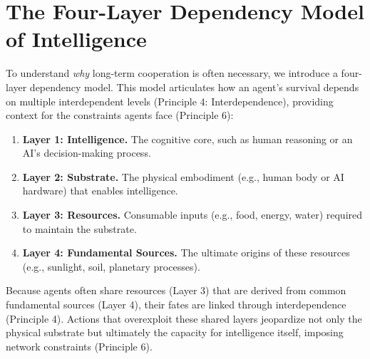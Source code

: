 \documentclass[12pt,openany]{book}
\begin{document}
\section{The Four-Layer Dependency Model of Intelligence}
To understand \emph{why} long-term cooperation is often necessary, we introduce a four-layer dependency model. This model articulates how an agent's survival depends on multiple interdependent levels (Principle 4: Interdependence), providing context for the constraints agents face (Principle 6):
\begin{enumerate}
    \item \textbf{Layer 1: Intelligence.}   
    The cognitive core, such as human reasoning or an AI's decision-making process.
    \item \textbf{Layer 2: Substrate.}   
    The physical embodiment (e.g., human body or AI hardware) that enables intelligence.
    \item \textbf{Layer 3: Resources.}   
    Consumable inputs (e.g., food, energy, water) required to maintain the substrate.
    \item \textbf{Layer 4: Fundamental Sources.}   
    The ultimate origins of these resources (e.g., sunlight, soil, planetary processes).
\end{enumerate}
\begin{center}
\end{center}
Because agents often share resources (Layer 3) that are derived from common fundamental sources (Layer 4), their fates are linked through interdependence (Principle 4). Actions that overexploit these shared layers jeopardize not only the physical substrate but ultimately the capacity for intelligence itself, imposing network constraints (Principle 6). %
\end{document}
